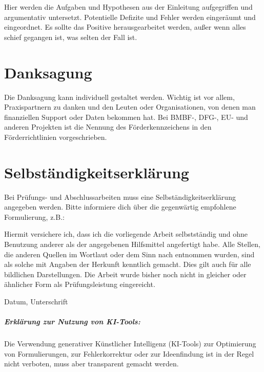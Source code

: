 \documentclass[fontsize=12pt,BCOR=12mm,logo/language=de]{tudcdreprt}
\begin{document}
Hier werden die Aufgaben und Hypothesen aus der Einleitung aufgegriffen und
argumentativ untersetzt. Potentielle Defizite und Fehler werden eingeräumt und
eingeordnet. Es sollte das Positive herausgearbeitet werden, außer wenn alles
schief gegangen ist, was selten der Fall ist.

\chapter*{Danksagung} %


Die Danksagung kann individuell gestaltet werden. Wichtig ist vor allem,
Praxispartnern zu danken und den Leuten oder Organisationen, von denen man
finanziellen Support oder Daten bekommen hat. Bei BMBF-, DFG-, EU- und anderen
Projekten ist die Nennung des Förderkennzeichens in den Förderrichtlinien
vorgeschrieben.

\chapter*{Selbständigkeitserklärung}

Bei Prüfungs- und Abschlussarbeiten muss eine Selbständigkeitserklärung angegeben werden.
Bitte informiere dich über die gegenwärtig empfohlene Formulierung, z.B.:

Hiermit versichere ich, dass ich die vorliegende Arbeit selbstständig und ohne Benutzung anderer als der angegebenen Hilfsmittel angefertigt habe. Alle Stellen, die anderen Quellen im Wortlaut oder dem Sinn nach entnommen wurden, sind als solche mit Angaben der Herkunft kenntlich gemacht. Dies gilt auch für alle bildlichen Darstellungen. Die Arbeit wurde bisher noch nicht in gleicher oder ähnlicher Form als Prüfungsleistung eingereicht.

Datum, Unterschrift

\paragraph{Erklärung zur Nutzung von KI-Tools:}
Die Verwendung generativer Künstlicher Intelligenz (KI-Tools) zur Optimierung von Formulierungen, zur Fehlerkorrektur oder zur Ideenfindung ist in der Regel nicht verboten, muss aber transparent gemacht werden.
\end{document}
